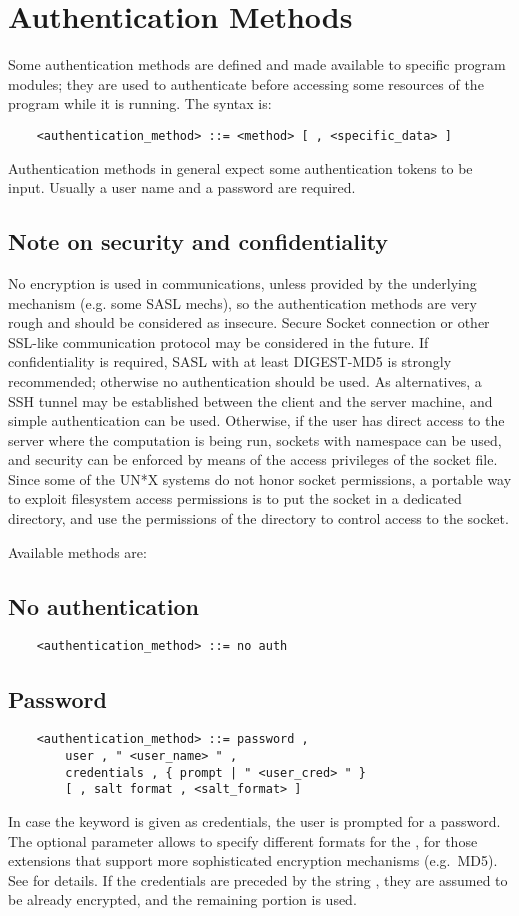 \section{Authentication Methods}
Some authentication methods are defined and made available to specific
program modules; they are used to authenticate before accessing some
resources of the program while it is running.
The syntax is:
\begin{verbatim}
    <authentication_method> ::= <method> [ , <specific_data> ]
\end{verbatim}
Authentication methods in general expect some authentication tokens to be
input.
Usually a user name and a password are required.

\subsection{Note on security and confidentiality}
No encryption is used in communications, unless provided
by the underlying mechanism (e.g. some SASL mechs), 
so the authentication methods are very rough
and should be considered as insecure.
Secure Socket connection or other SSL-like communication protocol
may be considered in the future.
If confidentiality is required, SASL with at least DIGEST-MD5 
is strongly recommended; otherwise no authentication should be used.
As alternatives, a SSH tunnel may be established between the client
and the server machine, and simple authentication can be used.
Otherwise, if the user has direct access to the server where
the computation is being run, sockets with  namespace
can be used, and security can be enforced by means of the access
privileges of the socket file.
Since some of the UN*X systems do not honor socket permissions,
a portable way to exploit filesystem access permissions is to put
the socket in a dedicated directory, and use the permissions
of the directory to control access to the socket.

\noindent
Available methods are:
\subsection{No authentication}
\begin{verbatim}
    <authentication_method> ::= no auth
\end{verbatim}

\subsection{Password}
\begin{verbatim}
    <authentication_method> ::= password ,
        user , " <user_name> " ,
        credentials , { prompt | " <user_cred> " }
        [ , salt format , <salt_format> ]
\end{verbatim}
In case the keyword  is given as credentials, the user is
prompted for a password.
The optional parameter  allows to specify different
formats for the , for those  extensions 
that support more sophisticated encryption mechanisms (e.g.\ MD5).
See  for details.
If the credentials are preceded by the string ,
they are assumed to be already encrypted, and the remaining portion is used.

